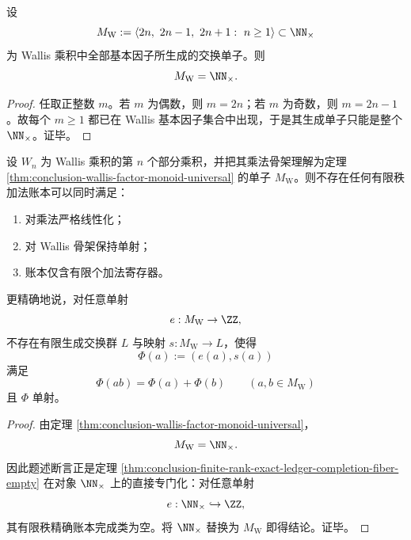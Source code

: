 \begin{theorem}\label{thm:conclusion-wallis-factor-monoid-universal}
设
\[
M_{\mathrm W}
:=
\langle 2n,\ 2n-1,\ 2n+1:\ n\ge 1\rangle
\subset \NN_{\times}
\]
为 Wallis 乘积中全部基本因子所生成的交换单子。则
\[
M_{\mathrm W}=\NN_{\times}.
\]
\end{theorem}
\begin{proof}
任取正整数 \(m\)。若 \(m\) 为偶数，则 \(m=2n\)；若 \(m\) 为奇数，则 \(m=2n-1\)。故每个 \(m\ge 1\) 都已在 Wallis 基本因子集合中出现，于是其生成单子只能是整个 \(\NN_{\times}\)。证毕。
\end{proof}

\begin{theorem}\label{thm:conclusion-wallis-finite-additive-ledger-impossible}
设 \(W_n\) 为 Wallis 乘积的第 \(n\) 个部分乘积，并把其乘法骨架理解为定理 \ref{thm:conclusion-wallis-factor-monoid-universal} 的单子 \(M_{\mathrm W}\)。则不存在任何有限秩加法账本可以同时满足：
\begin{enumerate}
  \item 对乘法严格线性化；
  \item 对 Wallis 骨架保持单射；
  \item 账本仅含有限个加法寄存器。
\end{enumerate}
更精确地说，对任意单射
\[
e:M_{\mathrm W}\to \ZZ,
\]
不存在有限生成交换群 \(L\) 与映射 \(s:M_{\mathrm W}\to L\)，使得
\[
\Phi(a):=(e(a),s(a))
\]
满足
\[
\Phi(ab)=\Phi(a)+\Phi(b)\qquad (a,b\in M_{\mathrm W})
\]
且 \(\Phi\) 单射。
\end{theorem}
\begin{proof}
由定理 \ref{thm:conclusion-wallis-factor-monoid-universal}，
\[
M_{\mathrm W}=\NN_{\times}.
\]
因此题述断言正是定理 \ref{thm:conclusion-finite-rank-exact-ledger-completion-fiber-empty} 在对象 \(\NN_{\times}\) 上的直接专门化：对任意单射
\[
e:\NN_{\times}\hookrightarrow \ZZ,
\]
其有限秩精确账本完成类为空。将 \(\NN_{\times}\) 替换为 \(M_{\mathrm W}\) 即得结论。证毕。
\end{proof}

